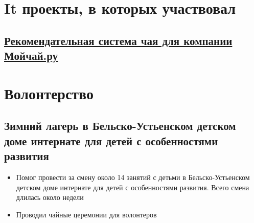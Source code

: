 \documentclass[11pt]{article}
\begin{document}
\section{It проекты, в которых участвовал}
\label{sec:org6a80a5f}
\subsection{\href{https://docs.google.com/presentation/d/1yi3B47CxyzGHnKza1snK03tzrlmESLaszM7MK1unRtk/edit\#slide=id.p}{Рекомендательная система чая для компании Мойчай.ру}}
\label{sec:org4d28411}
\section{Волонтерство}
\label{sec:orgb87a8d9}
\subsection{Зимний лагерь в Бельско-Устьенском детском доме интернате для детей с особенностями развития}
\label{sec:orgbea5b3d}
\begin{itemize}
\item Помог провести за смену около 14 занятий с детьми в Бельско-Устьенском детском доме интернате для детей с особенностями развития. Всего смена длилась около недели
\item Проводил чайные церемонии для волонтеров
\end{itemize}
\end{document}
